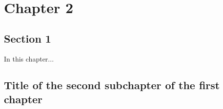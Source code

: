 \chapter{Chapter 2}

\section{Section 1}

In this chapter...

\section{Title of the second subchapter of the first chapter}
